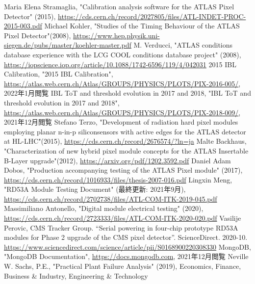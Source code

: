 \begin{thebibliography}{24}
Maria Elena Stramaglia, "Calibration analysis software for the ATLAS Pixel Detector" (2015), \url{https://cds.cern.ch/record/2027805/files/ATL-INDET-PROC-2015-003.pdf}
Michael Kohler, "Studies of the Timing Behaviour of the ATLAS Pixel Detector"(2008), \url{https://www.hep.physik.uni-siegen.de/pubs/master/koehler-master.pdf}
M. Verducci, "ATLAS conditions database experience with the LCG COOL conditions database project" (2008),
\url{https://iopscience.iop.org/article/10.1088/1742-6596/119/4/042031}
2015 IBL Calibration, "2015 IBL Calibration", \url{https://atlas.web.cern.ch/Atlas/GROUPS/PHYSICS/PLOTS/PIX-2016-005/}, 2022年1月閲覧
IBL ToT and threshold evolution in 2017 and 2018, "IBL ToT and threshold evolution in 2017 and 2018", \url{https://atlas.web.cern.ch/Atlas/GROUPS/PHYSICS/PLOTS/PIX-2018-009/}, 2021年12月閲覧
Stefano Terzo, "Development of radiation hard pixel modules employing planar n-in-p siliconsensors with active edges for the ATLAS detector at HL-LHC"(2015), \url{https://cds.cern.ch/record/2676574/?ln=ja}
Malte Backhaus, "Characterization of new hybrid pixel module concepts for the ATLAS Insertable B-Layer upgrade"(2012), \url{https://arxiv.org/pdf/1202.3592.pdf}
Daniel Adam Dobos, "Production accompanying testing of the ATLAS Pixel module" (2017),
\url{https://cds.cern.ch/record/1016933/files/thesis-2007-016.pdf}
Lingxin Meng, "RD53A Module Testing Document" (最終更新: 2021年9月),
\url{https://cds.cern.ch/record/2702738/files/ATL-COM-ITK-2019-045.pdf}
Massimiliano Antonello, "Digital module electrical testing" (2020),
\url{https://cds.cern.ch/record/2723333/files/ATL-COM-ITK-2020-020.pdf}
Vasilije Perovic, CMS Tracker Group. “Serial powering in four-chip prototype RD53A modules for Phase 2 upgrade of the CMS pixel detector”. ScienceDirect. 2020-10. \url{https://www.sciencedirect.com/science/article/pii/S0168900220308330}
MongoDB, "MongoDB Documentation", \url{https://docs.mongodb.com}, 2021年12月閲覧
Neville W. Sachs, P.E., "Practical Plant Failure Analysis" (2019), Economics, Finance, Business \& Industry, Engineering \& Technology
\end{thebibliography}
